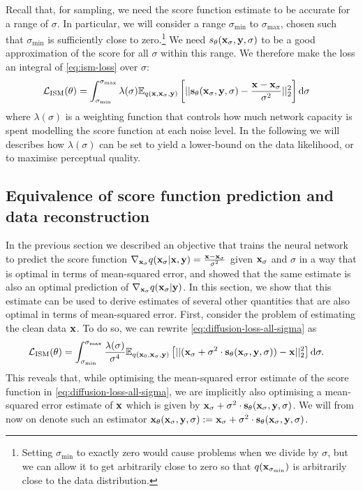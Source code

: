 Recall that, for sampling, we need the score function estimate to be accurate for a range of $\sigma$. In particular, we will consider a range $\sigma_\text{min}$ to $\sigma_\text{max}$, chosen such that $\sigma_\text{min}$ is sufficiently close to zero.\footnote{Setting $\sigma_\text{min}$ to exactly zero would cause problems when we divide by $\sigma$, but we can allow it to get arbitrarily close to zero so that $q({\mathbf{x}}_{\sigma_\text{min}})$ is arbitrarily close to the data distribution.} We need $s_\theta({\mathbf{x}}_\sigma, {\mathbf{y}}, \sigma)$ to be a good approximation of the score for all $\sigma$ within this range. We therefore make the loss an integral of \cref{eq:ism-loss} over $\sigma$:
\begin{align} \label{eq:diffusion-loss-all-sigma}
    \mathcal{L}_\text{ISM}(\theta) &= \int_{\sigma_\text{min}}^{\sigma_\text{max}} \lambda(\sigma) \mathbb{E}_{q({\mathbf{x}}, {\mathbf{x}}_\sigma, {\mathbf{y}})} \left[ 
    || {\mathbf{s}}_\theta({\mathbf{x}}_\sigma, {\mathbf{y}}, \sigma) - \frac{{\mathbf{x}}-{\mathbf{x}}_\sigma}{\sigma^2} ||_2^2 \right] \mathrm{d}\sigma
\end{align}
where $\lambda(\sigma)$ is a weighting function that controls how much network capacity is spent modelling the score function at each noise level. In the following we will describes how $\lambda(\sigma)$ can be set to yield a lower-bound on the data likelihood, or to maximise perceptual quality.

\subsection{Equivalence of score function prediction and data reconstruction} \label{eq:diffusion-equivalent-parameterisations}
In the previous section we described an objective that trains the neural network to predict the score function $\nabla_{{\mathbf{x}}_\sigma} q({\mathbf{x}}_\sigma|{\mathbf{x}},{\mathbf{y}}) = \frac{{\mathbf{x}}-{\mathbf{x}}_\sigma}{\sigma^2}$ given ${\mathbf{x}}_\sigma$ and $\sigma$ in a way that is optimal in terms of mean-squared error, and showed that the same estimate is also an optimal prediction of $\nabla_{{\mathbf{x}}_\sigma} q({\mathbf{x}}_\sigma|{\mathbf{y}})$. In this section, we show that this estimate can be used to derive estimates of several other quantities that are also optimal in terms of mean-squared error. First, consider the problem of estimating the clean data ${\mathbf{x}}$. To do so, we can rewrite \cref{eq:diffusion-loss-all-sigma} as
\begin{align} \label{eq:x0-diffusion-loss}
    \mathcal{L}_\text{ISM}(\theta) &= \int_{\sigma_\text{min}}^{\sigma_\text{max}} \frac{\lambda(\sigma)}{\sigma^4} \mathbb{E}_{q({\mathbf{x}}_0, {\mathbf{x}}_\sigma, {\mathbf{y}})} \left[ 
    || ({\mathbf{x}}_\sigma + \sigma^2 \cdot {\mathbf{s}}_\theta({\mathbf{x}}_\sigma, {\mathbf{y}}, \sigma)) - {\mathbf{x}} ||_2^2 \right] \mathrm{d}\sigma.
\end{align}
This reveals that, while optimising the mean-squared error estimate of the score function in \cref{eq:diffusion-loss-all-sigma}, we are implicitly also optimising a mean-squared error estimate of ${\mathbf{x}}$ which is given by ${\mathbf{x}}_\sigma + \sigma^2 \cdot {\mathbf{s}}_\theta({\mathbf{x}}_\sigma, {\mathbf{y}}, \sigma)$. We will from now on denote such an estimator ${\mathbf{x}}_\theta({\mathbf{x}}_\sigma, {\mathbf{y}}, \sigma) := {\mathbf{x}}_\sigma + \sigma^2 \cdot {\mathbf{s}}_\theta({\mathbf{x}}_\sigma, {\mathbf{y}}, \sigma)$.

